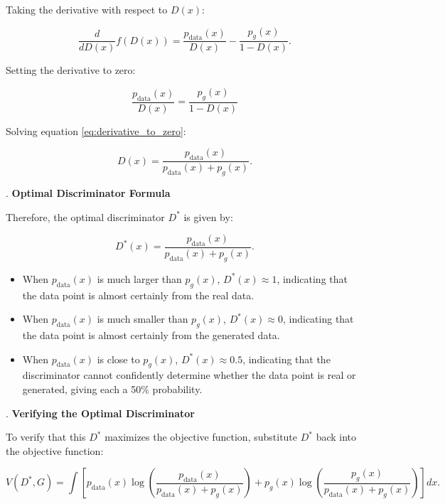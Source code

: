 Taking the derivative with respect to \( D(x) \):

\begin{equation}
    \frac{d}{dD(x)} f(D(x)) = \frac{p_{\text{data}}(x)}{D(x)} - \frac{p_g(x)}{1 - D(x)}.
\end{equation}

Setting the derivative to zero:

\begin{equation}
    \frac{p_{\text{data}}(x)}{D(x)} = \frac{p_g(x)}{1 - D(x)}
    \label{eq:derivative_to_zero}
\end{equation}

Solving equation \eqref{eq:derivative_to_zero}:

\begin{equation}
    D(x) = \frac{p_{\text{data}}(x)}{p_{\text{data}}(x) + p_g(x)}.
\end{equation}

. \textbf{Optimal Discriminator Formula}

Therefore, the optimal discriminator \( D^* \) is given by:

\begin{equation}
    D^*(x) = \frac{p_{\text{data}}(x)}{p_{\text{data}}(x) + p_g(x)}.
\end{equation}


\begin{itemize}
    \item When $p_{\text{data}}(x)$ is much larger than $p_g(x)$, $D^*(x) \approx 1$, indicating that the data point is almost certainly from the real data.
    
    \item When $p_{\text{data}}(x)$ is much smaller than $p_g(x)$, $D^*(x) \approx 0$, indicating that the data point is almost certainly from the generated data.
    
    \item When $p_{\text{data}}(x)$ is close to $p_g(x)$, $D^*(x) \approx 0.5$, indicating that the discriminator cannot confidently determine whether the data point is real or generated, giving each a 50\% probability.
\end{itemize}

. \textbf{Verifying the Optimal Discriminator}

To verify that this \( D^* \) maximizes the objective function, substitute \( D^* \) back into the objective function:

\begin{equation}
    V(D^*, G) = \int \left[ p_{\text{data}}(x) \log \left( \frac{p_{\text{data}}(x)}{p_{\text{data}}(x) + p_g(x)} \right) + p_g(x) \log \left( \frac{p_g(x)}{p_{\text{data}}(x) + p_g(x)} \right) \right] dx.
\end{equation}

